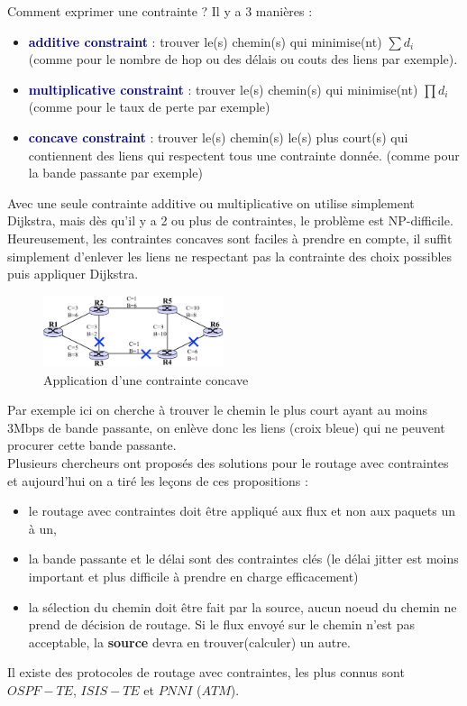 \documentclass{article}
\newcommand{\dblu}[1]{\textcolor{darkblue}{\textbf{#1}}}
\begin{document}
\begin{sffamily}
Comment exprimer une contrainte ? Il y a 3 manières :
\begin{itemize}
\item \dblu{additive constraint} : trouver le(s) chemin(s) qui minimise(nt) $\sum{d_i}$ (comme pour le nombre de hop ou des 
délais ou couts des liens par exemple).
\item \dblu{multiplicative constraint} : trouver le(s) chemin(s) qui minimise(nt) $\prod{d_i}$ (comme pour le taux de perte par 
exemple)
\item \dblu{concave constraint} : trouver le(s) chemin(s) le(s) plus court(s) qui contiennent des liens qui respectent tous une 
contrainte donnée. (comme pour la bande passante par exemple)
\end{itemize}

Avec une seule contrainte additive ou multiplicative on utilise simplement Dijkstra, mais dès qu'il y a 2 ou plus de 
contraintes, le problème est NP-difficile. Heureusement, les contraintes concaves sont faciles à prendre en compte, il suffit 
simplement d'enlever les liens ne respectant pas la contrainte des choix possibles puis appliquer Dijkstra.

\begin{figure}[h!]
    \begin{center}
    \includegraphics[width=200px]{img_022.pdf}
    \caption{Application d'une contrainte concave}
    \end{center}	
\end{figure}

Par exemple ici on cherche à trouver le chemin le plus court ayant au moins 3Mbps de bande passante, on enlève donc les liens 
(croix bleue) qui ne peuvent procurer cette bande passante. \\

Plusieurs chercheurs ont proposés des solutions pour le routage avec contraintes et aujourd'hui on a tiré les leçons de ces
propositions :
\begin{itemize}
\item le routage avec contraintes doit être appliqué aux flux et non aux paquets un à un,
\item la bande passante et le délai sont des contraintes clés (le délai jitter est moins important et plus difficile à prendre 
en charge efficacement)
\item la sélection du chemin doit être fait par la source, aucun noeud du chemin ne prend de décision de routage. Si le flux 
envoyé sur le chemin n'est pas acceptable, la \textbf{source} devra en trouver(calculer) un autre.
\end{itemize}
Il existe des protocoles de routage avec contraintes, les plus connus sont $OSPF-TE$, $ISIS-TE$ et $PNNI$ ($ATM$). \\


\end{sffamily}
\end{document}
